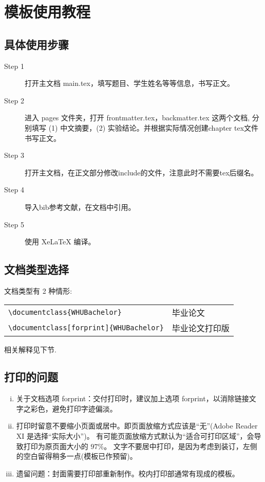 \chapter{模板使用教程}
 
 \section{具体使用步骤}

 \begin{description}
  \item[Step 1]  打开主文档 main.tex，填写题目、学生姓名等等信息，书写正文。
  \item[Step 2]  进入 pages 文件夹，打开 frontmatter.tex，backmatter.tex 这两个文档,
  分别填写 (1) 中文摘要，(2) 实验结论。并根据实际情况创建chapter tex文件书写正文。
  \item[Step 3]  打开主文档，在正文部分修改include的文件，注意此时不需要tex后缀名。
  \item[Step 4]  导入bib参考文献，在文档中引用。 
  \item[Step 5]  使用 XeLaTeX 编译。
\end{description}

\section{文档类型选择}

{\textbf{}}

文档类型有 2 种情形:

\begin{table}[ht]\centering
\begin{tabular}{ll}
\hline
   \verb|\documentclass{WHUBachelor}|                     &  毕业论文 \\
   \verb|\documentclass[forprint]{WHUBachelor}|        &  毕业论文打印版 \\
\hline
\end{tabular}
\end{table}
相关解释见下节.


\section{打印的问题}

{\textbf{}}

\begin{enumerate}[i)] 
  \item  关于文档选项 forprint：交付打印时，建议加上选项 forprint，以消除链接文字之彩色，避免打印字迹偏淡。
  \item  打印时留意不要缩小页面或居中。即页面放缩方式应该是“无”(Adobe Reader XI 是选择“实际大小”)。
           有可能页面放缩方式默认为“适合可打印区域”，会导致打印为原页面大小的 $97\%$。
           文字不要居中打印，是因为考虑到装订，左侧的空白留得稍多一点(模板已作预留)。
  \item  遗留问题：封面需要打印部重新制作。校内打印部通常有现成的模板。
\end{enumerate}

